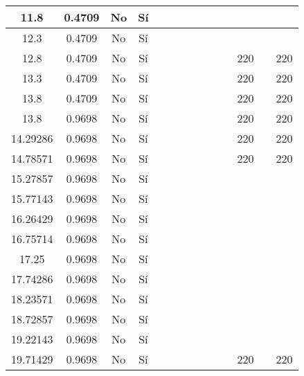\begin{table}[H]
{\begin{tabular}{|c|c|c|c|c|c|c|c|c|c|c|c|c|c|}
\hline
11.8 & 0.4709 & No  & Sí  &     &     &     &     &     &     &     &     &     &  \bigstrut\\
\hline
12.3 & 0.4709 & No  & Sí  &     &     &     &     &     &     &     &     &     &  \bigstrut\\
\hline
12.8 & 0.4709 & No  & Sí  &     &     &     &     &     &     &     & 220 &     & 220 \bigstrut\\
\hline
13.3 & 0.4709 & No  & Sí  &     &     &     &     &     &     &     & 220 &     & 220 \bigstrut\\
\hline
13.8 & 0.4709 & No  & Sí  &     &     &     &     &     &     &     & 220 &     & 220 \bigstrut\\
\hline
13.8 & 0.9698 & No  & Sí  &     &     &     &     &     &     &     & 220 &     & 220 \bigstrut\\
\hline
14.29286 & 0.9698 & No  & Sí  &     &     &     &     &     &     &     & 220 &     & 220 \bigstrut\\
\hline
14.78571 & 0.9698 & No  & Sí  &     &     &     &     &     &     &     & 220 &     & 220 \bigstrut\\
\hline
15.27857 & 0.9698 & No  & Sí  &     &     &     &     &     &     &     &     &     &  \bigstrut\\
\hline
15.77143 & 0.9698 & No  & Sí  &     &     &     &     &     &     &     &     &     &  \bigstrut\\
\hline
16.26429 & 0.9698 & No  & Sí  &     &     &     &     &     &     &     &     &     &  \bigstrut\\
\hline
16.75714 & 0.9698 & No  & Sí  &     &     &     &     &     &     &     &     &     &  \bigstrut\\
\hline
17.25 & 0.9698 & No  & Sí  &     &     &     &     &     &     &     &     &     &  \bigstrut\\
\hline
17.74286 & 0.9698 & No  & Sí  &     &     &     &     &     &     &     &     &     &  \bigstrut\\
\hline
18.23571 & 0.9698 & No  & Sí  &     &     &     &     &     &     &     &     &     &  \bigstrut\\
\hline
18.72857 & 0.9698 & No  & Sí  &     &     &     &     &     &     &     &     &     &  \bigstrut\\
\hline
19.22143 & 0.9698 & No  & Sí  &     &     &     &     &     &     &     &     &     &  \bigstrut\\
\hline
19.71429 & 0.9698 & No  & Sí  &     &     &     &     &     &     &     & 220 &     & 220 \bigstrut\\

\end{tabular}}
\end{table}
